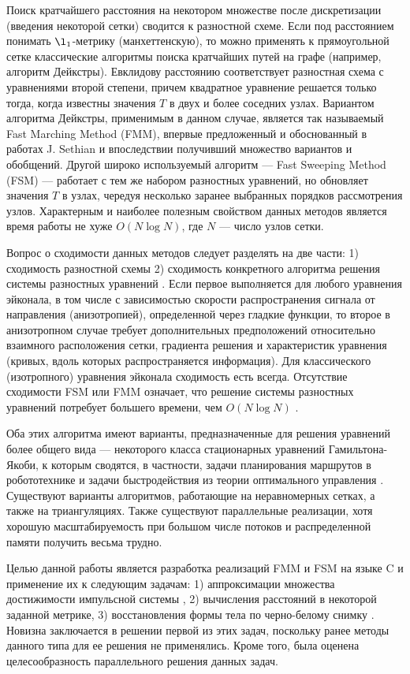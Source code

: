 Поиск кратчайшего расстояния на некотором множестве после
дискретизации (введения некоторой сетки) сводится к разностной схеме.
Если под расстоянием понимать $\l_1$-метрику (манхеттенскую), то можно
применять к прямоугольной сетке классические алгоритмы поиска
кратчайших путей на графе (например, алгоритм Дейкстры). Евклидову
расстоянию соответствует разностная схема с уравнениями второй
степени, причем квадратное уравнение решается только тогда, когда
известны значения $T$ в двух и более соседних узлах.  Вариантом
алгоритма Дейкстры, применимым в данном случае, является так
называемый Fast Marching Method (FMM), впервые предложенный и
обоснованный в работах J. Sethian \cite{S1999,AV2003} и впоследствии
получивший множество вариантов и обобщений. Другой широко используемый
алгоритм --- Fast Sweeping Method (FSM) --- работает с тем же набором
разностных уравнений, но обновляет значения $T$ в узлах, чередуя
несколько заранее выбранных порядков рассмотрения узлов.  Характерным
и наиболее полезным свойством данных методов является время работы не
хуже $O(N \log N)$, где $N$ --- число узлов сетки.
 
Вопрос о сходимости данных методов следует разделять на две части: 1)
сходимость разностной схемы 2) сходимость конкретного алгоритма
решения системы разностных уравнений \cite{J2015, A2006}.  Если первое
выполняется для любого уравнения эйконала, в том числе с зависимостью
скорости распространения сигнала от направления (анизотропией),
определенной через гладкие функции, то второе в анизотропном случае
требует дополнительных предположений относительно взаимного
расположения сетки, градиента решения и характеристик уравнения
(кривых, вдоль которых распространяется информация). Для классического
(изотропного) уравнения эйконала сходимость есть всегда.  Отсутствие
сходимости FSM или FMM означает, что решение системы разностных
уравнений потребует большего времени, чем $O(N \log N)$
\cite{E2014}.
 
Оба этих алгоритма имеют варианты, предназначенные для решения
уравнений более общего вида --- некоторого класса стационарных
уравнений Гамильтона-Якоби, к которым сводятся, в частности, задачи
планирования маршрутов в робототехнике и задачи быстродействия из
теории оптимального управления \cite{L2016}.  Существуют варианты
алгоритмов, работающие на неравномерных сетках, а также на
триангуляциях\cite{FSA2007}. Также существуют параллельные реализации,
хотя хорошую масштабируемость при большом числе потоков и
распределенной памяти получить весьма трудно.

Целью данной работы является разработка реализаций FMM и FSM на языке
C и применение их к следующим задачам: 1) аппроксимации множества
достижимости импульсной системы \cite{D2003,AVS2016,
  AV2015_1,AV2015_2}, 2) вычисления расстояний в некоторой заданной
метрике\cite{KL2011}, 3) восстановления формы тела по черно-белому
снимку \cite{I2005,SFS2009, JDM2008}. Новизна заключается в решении
первой из этих задач, поскольку ранее методы данного типа для ее
решения не применялись. Кроме того, была оценена целесообразность
параллельного решения данных задач.

